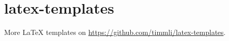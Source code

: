 \section{latex-templates}

More \LaTeX{} templates on \url{https://github.com/timmli/latex-templates}.